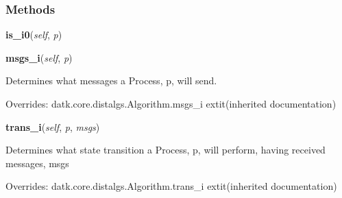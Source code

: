 
  \subsubsection{Methods}

    \label{datk:core:algs:SynchBFSAck:is_i0}

    \vspace{0.5ex}

\hspace{.8\funcindent}\begin{boxedminipage}{\funcwidth}

    \raggedright \textbf{is\_i0}(\textit{self}, \textit{p})

\setlength{\parskip}{2ex}
\setlength{\parskip}{1ex}
    \end{boxedminipage}

    \vspace{0.5ex}

\hspace{.8\funcindent}\begin{boxedminipage}{\funcwidth}

    \raggedright \textbf{msgs\_i}(\textit{self}, \textit{p})

\setlength{\parskip}{2ex}
    Determines what messages a Process, p, will send.

\setlength{\parskip}{1ex}
      Overrides: datk.core.distalgs.Algorithm.msgs\_i 	extit{(inherited documentation)}

    \end{boxedminipage}

    \vspace{0.5ex}

\hspace{.8\funcindent}\begin{boxedminipage}{\funcwidth}

    \raggedright \textbf{trans\_i}(\textit{self}, \textit{p}, \textit{msgs})

\setlength{\parskip}{2ex}
    Determines what state transition a Process, p, will perform, having 
    received messages, msgs

\setlength{\parskip}{1ex}
      Overrides: datk.core.distalgs.Algorithm.trans\_i 	extit{(inherited documentation)}

    \end{boxedminipage}


